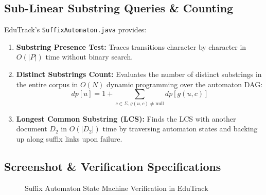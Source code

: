\subsection{Sub-Linear Substring Queries \& Counting}
EduTrack's \texttt{SuffixAutomaton.java} provides:
\begin{enumerate}
    \item \textbf{Substring Presence Test:} Traces transitions character by character in $O(|P|)$ time without binary search.
    \item \textbf{Distinct Substrings Count:} Evaluates the number of distinct substrings in the entire corpus in $O(N)$ dynamic programming over the automaton DAG:
    \begin{equation}
    dp[u] = 1 + \sum_{c \in \Sigma, g(u, c) \ne \text{null}} dp[g(u, c)]
    \end{equation}
    \item \textbf{Longest Common Substring (LCS):} Finds the LCS with another document $D_2$ in $O(|D_2|)$ time by traversing automaton states and backing up along suffix links upon failure.
\end{enumerate}

\subsection{Screenshot \& Verification Specifications}
\begin{figure}[H]
    \centering
    \caption{Suffix Automaton State Machine Verification in EduTrack}
    \label{fig:screenshot_sam}
\end{figure}
